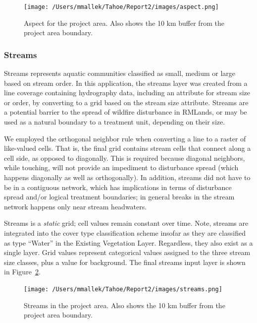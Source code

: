 \begin{figure}[htbp]
\centering
\texttt{[image: /Users/mmallek/Tahoe/Report2/images/aspect.png]}
\caption{Aspect for the project area. Also shows the 10 km buffer from the project area boundary.} 
\label{aspectmap}
\end{figure}

\subsubsection{Streams} 
Streams represents aquatic communities classified as small, medium or large based on stream order. In this application, the streams layer was created from a line coverage containing hydrography data, including an attribute for stream size or order, by converting to a grid based on the stream size attribute. Streams are a potential barrier to the spread of wildfire disturbance in RMLands, or may be used as a natural boundary to a treatment unit, depending on their size.

We employed the orthogonal neighbor rule when converting a line to a raster of like-valued cells. That is, the final grid contains stream cells that connect along a cell side, as opposed to diagonally. This is required because diagonal neighbors, while touching, will not provide an impediment to disturbance spread (which happens diagonally as well as orthogonally). In addition, streams did not have to be in a contiguous network, which has implications in terms of disturbance spread and/or logical treatment boundaries; in general breaks in the stream network happens only near stream headwaters. 

Streams is a \emph{static} grid; cell values remain constant over time. Note, streams are integrated into the cover type classification scheme insofar as they are classified as type ``Water'' in the Existing Vegetation Layer. Regardless, they also exist as a single layer. Grid values represent categorical values assigned to the three stream size classes, plus a value for background. The final streams input layer is shown in Figure~\ref{streamsmap}.

\begin{figure}[htbp]
\centering
\texttt{[image: /Users/mmallek/Tahoe/Report2/images/streams.png]}
\caption{Streams in the project area. Also shows the 10 km buffer from the project area boundary.} 
\label{streamsmap}
\end{figure}

